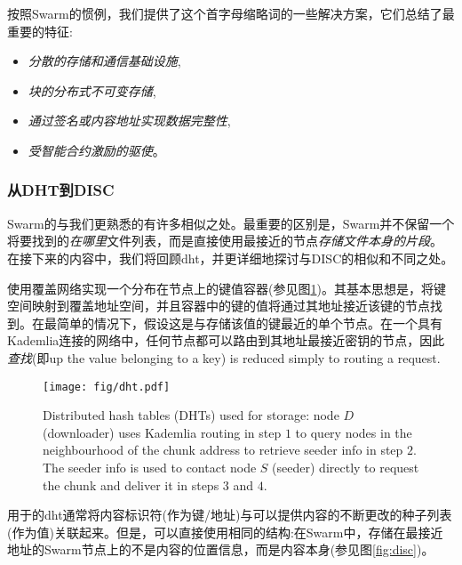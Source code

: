 按照Swarm的惯例，我们提供了这个首字母缩略词的一些解决方案，它们总结了最重要的特征:


\begin{itemize}
\item \emph{分散的存储和通信基础设施}, 
\item \emph{块的分布式不可变存储}, 
\item \emph{通过签名或内容地址实现数据完整性},
\item \emph{受智能合约激励的驱使}。 

\end{itemize}
 
\subsubsection{从DHT到DISC}
Swarm的与我们更熟悉的有许多相似之处。最重要的区别是，Swarm并不保留一个将要找到的\emph{在哪里}文件列表，而是直接使用最接近的节点\emph{存储文件本身的片段}。 
在接下来的内容中，我们将回顾dht，并更详细地探讨与DISC的相似和不同之处。 
 
使用覆盖网络实现一个分布在节点上的键值容器(参见图\ref{fig:DHT})。其基本思想是，将键空间映射到覆盖地址空间，并且容器中的键的值将通过其地址接近该键的节点找到。在最简单的情况下，假设这是与存储该值的键最近的单个节点。在一个具有Kademlia连接的网络中，任何节点都可以路由到其地址最接近密钥的节点，因此\emph{查找}(即\looking up the value belonging to a key) is reduced simply to routing a request.\begin{figure}[htbp]
   \centering
   \texttt{[image: fig/dht.pdf]}
   \caption[Distributed hash tables (DHTs) \statusgreen]{Distributed hash tables (DHTs) used for storage:  node $D$ (downloader) uses Kademlia routing in step $1$ to query nodes in the neighbourhood of the chunk address to retrieve seeder info in step $2$. The seeder info is used to contact node $S$ (seeder) directly to request the chunk and deliver it in steps $3$ and $4$.}
   \label{fig:DHT}
\end{figure}

用于的dht通常将内容标识符(作为键/地址)与可以提供内容\cite{ipfs2014, crosby2007analysis}的不断更改的种子列表(作为值)关联起来。但是，可以直接使用相同的结构:在Swarm中，存储在最接近地址的Swarm节点上的不是内容的位置信息，而是内容本身(参见图\ref{fig:disc})。 


